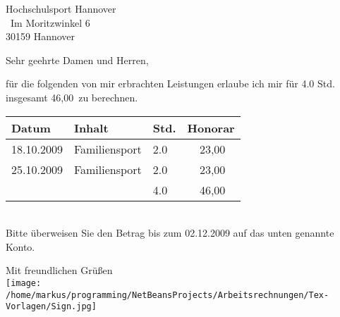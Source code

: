 \documentclass[a4paper,12pt]{scrlttr2}
\begin{document}
\begin{letter}{Hochschulsport Hannover\\\
Im Moritzwinkel 6\\
30159 Hannover}
\opening{Sehr geehrte Damen und Herren,}
für die folgenden von mir erbrachten Leistungen erlaube ich mir  für 4.0 Std. insgesamt 46,00\officialeuro\ 
 zu berechnen.

\begin{tabular}{|l|l|l|r|}\hline 
Datum & Inhalt & Std. & Honorar\\\hline \hline 
18.10.2009 & Familiensport & 2.0 & 23,00 \officialeuro\ \\\hline 
25.10.2009 & Familiensport & 2.0 & 23,00 \officialeuro\ \\\hline 
\hline & & 4.0 & 46,00 \officialeuro\ \\\hline 
\end{tabular}\\


Bitte überweisen Sie den Betrag bis zum 02.12.2009
 auf das unten genannte Konto.
\closing{Mit freundlichen Grüßen\\\texttt{[image: /home/markus/programming/NetBeansProjects/Arbeitsrechnungen/Tex-Vorlagen/Sign.jpg]}}


\end{letter}
\end{document}
